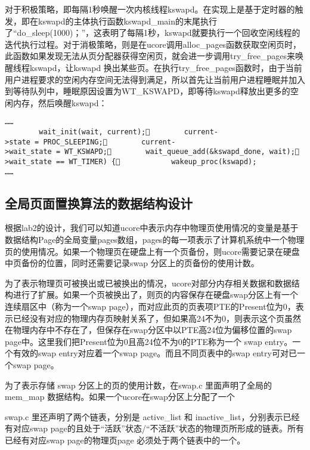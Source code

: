 对于积极策略，即每隔1秒唤醒一次内核线程kswapd。在实现上是基于定时器的触发，即在kswapd的主体执行函数kswapd\_main的末尾执行了``do\_sleep(1000)；''，这表明了每隔1秒，kswapd就要执行一个回收空闲线程的迭代执行过程。对于消极策略，则是在ucore调用alloc\_pages函数获取空闲页时，此函数如果发现无法从页分配器获得空闲页，就会进一步调用try\_free\_pages来唤醒线程kswapd，让kswapd
换出某些页。在执行try\_free\_pages函数时，由于当前用户进程要求的空闲内存空间无法得到满足，所以首先让当前用户进程睡眠并加入到等待队列中，睡眠原因设置为WT\_KSWAPD，即等待kswapd释放出更多的空闲内存，然后唤醒kswapd：

\begin{lstlisting}
……
        wait_init(wait, current);        current->state = PROC_SLEEPING;        current->wait_state = WT_KSWAPD;        wait_queue_add(&kswapd_done, wait);        if (kswapd->wait_state == WT_TIMER) {            wakeup_proc(kswapd);
……
\end{lstlisting}

\subsection{全局页面置换算法的数据结构设计}\label{ux5168ux5c40ux9875ux9762ux7f6eux6362ux7b97ux6cd5ux7684ux6570ux636eux7ed3ux6784ux8bbeux8ba1}

根据lab2的设计，我们可以知道ucore中表示内存中物理页使用情况的变量是基于数据结构Page的全局变量pages数组，pages的每一项表示了计算机系统中一个物理页的使用情况。如果一个物理页在硬盘上有一个页备份，则ucore需要记录在硬盘中页备份的位置，同时还需要记录swap
分区上的页备份的使用计数。

为了表示物理页可被换出或已被换出的情况，ucore对部分内存相关数据和数据结构进行了扩展。如果一个页被换出了，则页的内容保存在硬盘swap分区上有一个连续扇区中（称为一个swap
page），而对应此页的页表项PTE的Present位为0，表示已经没有对应的物理内存页映射关系了，但如果高24不为0，则表示这个页虽然在物理内存中不存在了，但保存在swap分区中以PTE高24位为偏移位置的swap
page中。这里我们把Present位为0且高24位不为0的PTE称为一个 swap
entry。一个有效的swap entry对应着一个swap page。而且不同页表中的swap
entry可对已一个swap page。

为了表示存储 swap 分区上的页的使用计数，在swap.c 里面声明了全局的
mem\_map 数据结构。如果一个ucore在swap分区上分配了一个

swap.c 里还声明了两个链表，分别是 active\_list 和
inactive\_list，分别表示已经有对应swap
page的且处于``活跃''状态/``不活跃''状态的物理页所形成的链表。所有已经有对应swap
page的物理页page 必须处于两个链表中的一个。

